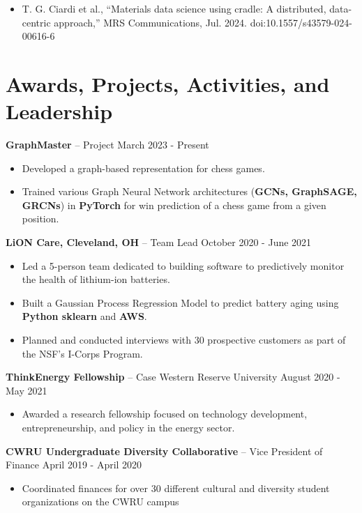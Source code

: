 \documentclass{res}
\begin{document}
\begin{resume}
\begin{itemize}
	\item T. G. Ciardi et al., “Materials data science using cradle: A distributed, data-centric approach,” MRS Communications, Jul. 2024. doi:10.1557/s43579-024-00616-6 
\end{itemize}

\section{Awards, Projects, Activities, and Leadership} 
{\large{\bf GraphMaster} – Project \hfill March 2023 - Present}
\begin{itemize} \itemsep -2pt
	\item Developed a graph-based representation for chess games.
	\item Trained various Graph Neural Network architectures (\textbf{GCNs, GraphSAGE, GRCNs}) in \textbf{PyTorch} for win prediction of a chess game from a given position.
\end{itemize}
{\large{\bf LiON Care, Cleveland, OH} – Team Lead \hfill October 2020 - June 2021}
\begin{itemize} \itemsep -2pt
	\item Led a 5-person team dedicated to building software to predictively monitor the health of lithium-ion batteries.
	\item Built a Gaussian Process Regression Model to predict battery aging using \textbf{Python sklearn} and \textbf{AWS}.
	\item Planned and conducted interviews with 30 prospective customers as part of the NSF's I-Corps Program.
\end{itemize}
{\large{\bf  ThinkEnergy Fellowship } – Case Western Reserve University  \hfill    August 2020 - May 2021 }
\begin{itemize} \itemsep -2pt
	\item Awarded a research fellowship focused on technology development, entrepreneurship, and policy in the energy sector.
\end{itemize}
{\large{\bf  CWRU Undergraduate Diversity Collaborative} – Vice President of Finance     \hfill    April 2019 - April 2020 }
 \begin{itemize} \itemsep -2pt
 \item Coordinated finances for over 30 different cultural and diversity student organizations on the CWRU campus 
 \end{itemize}

		

\end{resume} 
\end{document}
